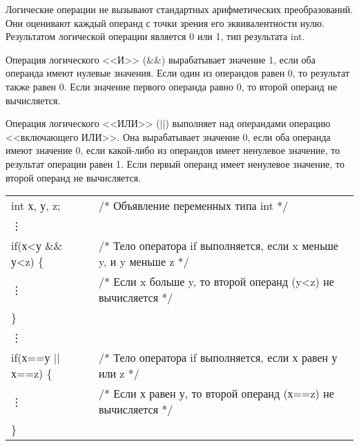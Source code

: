 Логические операции не вызывают стандартных арифметических преобразований. Они оценивают каждый операнд с точки зрения его эквивалентности нулю. Результатом логической операции является 0 или 1, тип результата int. \killoverfullbefore

Операция логического <<И>> (\&\&) вырабатывает значение 1, если оба операнда имеют нулевые значения. Если один из операндов равен 0, то результат также равен 0. Если значение первого операнда равно 0, то второй операнд не вычисляется. \killoverfullbefore

Операция логического <<ИЛИ>> ($\vert$$\vert$) выполняет над операндами операцию <<включающего ИЛИ>>. Она вырабатывает значение 0, если оба операнда имеют значение 0, если какой-либо из операндов имеет ненулевое значение, то результат операции равен 1. Если первый операнд имеет ненулевое значение, то второй операнд не вычисляется. \killoverfullbefore \BL

\begin{pExample}
\begin{tabular}{ l l }
int х, у, z; & \textcolor{exComm}{/* Объявление переменных типа int */} \\
\vdots & \textcolor{exComm}{ } \\
if(х<у \&\& у<z) \{ & \textcolor{exComm}{/* Тело оператора if выполняется, если x меньше y, и y меньше z */} \\
\vdots & \textcolor{exComm}{/* Если x больше y, то второй операнд (y<z) не вычисляется */} \\
\} & \textcolor{exComm}{ } \\
\vdots & \textcolor{exComm}{ } \\
if(х==у $\vert$$\vert$ х==z) \{ & \textcolor{exComm}{/*  Тело оператора if выполняется, если х равен у или z */} \\
\vdots & \textcolor{exComm}{/* Если х равен у, то второй операнд (х==z) не вычисляется */} \\
\} & \textcolor{exComm}{ } \\
\end{tabular}
\end{pExample}

\subsection{}

